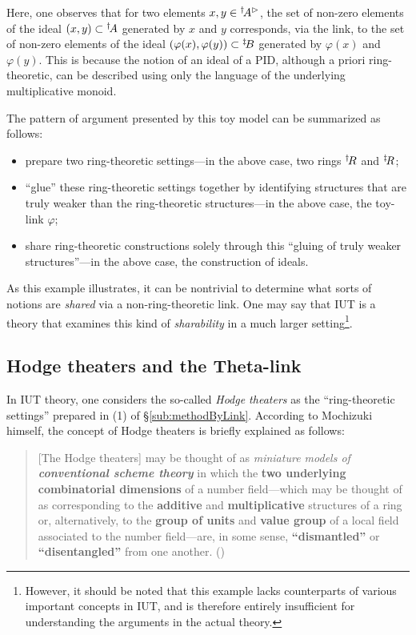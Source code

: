 \documentclass[12pt, reqno, a4paper]{amsart}
\begin{document}
Here, one observes that for two elements $x,y\in \prescript\dag{}\!A^\rhd$, the set of non-zero elements of the ideal $(x,y)\subset \prescript\dag{}\!A$ generated by $x$ and $y$ corresponds, via the link, to the set of non-zero elements of the ideal $(\varphi(x),\varphi(y))\subset \prescript\ddag{}\!B$ generated by $\varphi(x)$ and $\varphi(y)$.
This is because the notion of an ideal of a PID, although a priori ring-theoretic, can be described using only the language of the underlying multiplicative monoid.

The pattern of argument presented by this toy model can be summarized as follows:
\begin{itemize}
\item[(1)] prepare two ring-theoretic settings---in the above case, two rings $\prescript\dag{}\!R$ and $\prescript\ddag{}\!R$;
\item[(2)] ``glue'' these ring-theoretic settings together by identifying structures that are truly weaker than the ring-theoretic structures---in the above case, the toy-link $\varphi$;
\item[(3)] share ring-theoretic constructions solely through this ``gluing of truly weaker structures''---in the above case, the construction of ideals.
\end{itemize}

As this example illustrates, it can be nontrivial to determine what sorts of notions are {\it shared} via a non-ring-theoretic link. One may say that IUT is a theory that examines this kind of {\it sharability} in a much larger setting\footnote{However, it should be noted that this example lacks counterparts of various important concepts in IUT, and is therefore entirely insufficient for understanding the arguments in the actual theory.}.

\subsection{Hodge theaters and the Theta-link}\label{sub:HodgeTheaterThetaLink}
In IUT theory, one considers the so-called {\it Hodge theaters} as the ``ring-theoretic settings'' prepared in (1) of \S\ref{sub:methodByLink}.
According to Mochizuki himself, the concept of Hodge theaters is briefly explained as follows:

\medskip
\begin{quote}
[The Hodge theaters] may be thought of as {\it miniature
models of {\bf conventional scheme theory}} in which the {\bf two
underlying combinatorial dimensions} of a number field---which may
be thought of as corresponding to the {\bf additive} and {\bf
multiplicative} structures of a ring or, alternatively, to the {\bf
group of units} and {\bf value group} of a local field associated to
the number field---are, in some sense, {\bf ``dismantled''} or {\bf
``disentangled''} from one another.  (\cite[Abstract, p.\ 3]{MR4225473})
\end{quote}
\end{document}
